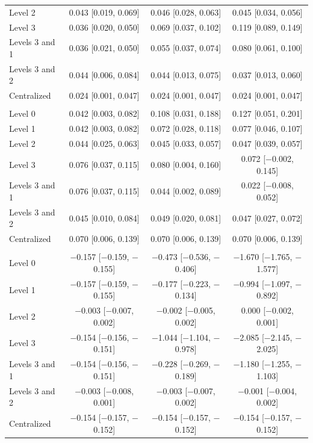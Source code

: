 \begin{tabular}{lccc}
Level 2 & 0.043 [0.019, 0.069] & 0.046 [0.028, 0.063] & 0.045 [0.034, 0.056] \\
Level 3 & 0.036 [0.020, 0.050] & 0.069 [0.037, 0.102] & 0.119 [0.089, 0.149] \\
Levels 3 and 1 & 0.036 [0.021, 0.050] & 0.055 [0.037, 0.074] & 0.080 [0.061, 0.100] \\
Levels 3 and 2 & 0.044 [0.006, 0.084] & 0.044 [0.013, 0.075] & 0.037 [0.013, 0.060] \\
Centralized & 0.024 [0.001, 0.047] & 0.024 [0.001, 0.047] & 0.024 [0.001, 0.047] \\
\addlinespace
\multicolumn{4}{@{}l}{\textit{Diabetic, XGBoost}} \\
Level 0 & 0.042 [0.003, 0.082] & 0.108 [0.031, 0.188] & 0.127 [0.051, 0.201] \\
Level 1 & 0.042 [0.003, 0.082] & 0.072 [0.028, 0.118] & 0.077 [0.046, 0.107] \\
Level 2 & 0.044 [0.025, 0.063] & 0.045 [0.033, 0.057] & 0.047 [0.039, 0.057] \\
Level 3 & 0.076 [0.037, 0.115] & 0.080 [0.004, 0.160] & 0.072 [$-$0.002, 0.145] \\
Levels 3 and 1 & 0.076 [0.037, 0.115] & 0.044 [0.002, 0.089] & 0.022 [$-$0.008, 0.052] \\
Levels 3 and 2 & 0.045 [0.010, 0.084] & 0.049 [0.020, 0.081] & 0.047 [0.027, 0.072] \\
Centralized & 0.070 [0.006, 0.139] & 0.070 [0.006, 0.139] & 0.070 [0.006, 0.139] \\
\addlinespace
\multicolumn{4}{@{}l}{\textit{Heart, Random Forest}} \\
Level 0 & $-$0.157 [$-$0.159, $-$0.155] & $-$0.473 [$-$0.536, $-$0.406] & $-$1.670 [$-$1.765, $-$1.577] \\
Level 1 & $-$0.157 [$-$0.159, $-$0.155] & $-$0.177 [$-$0.223, $-$0.134] & $-$0.994 [$-$1.097, $-$0.892] \\
Level 2 & $-$0.003 [$-$0.007, 0.002] & $-$0.002 [$-$0.005, 0.002] & 0.000 [$-$0.002, 0.001] \\
Level 3 & $-$0.154 [$-$0.156, $-$0.151] & $-$1.044 [$-$1.104, $-$0.978] & $-$2.085 [$-$2.145, $-$2.025] \\
Levels 3 and 1 & $-$0.154 [$-$0.156, $-$0.151] & $-$0.228 [$-$0.269, $-$0.189] & $-$1.180 [$-$1.255, $-$1.103] \\
Levels 3 and 2 & $-$0.003 [$-$0.008, 0.001] & $-$0.003 [$-$0.007, 0.002] & $-$0.001 [$-$0.004, 0.002] \\
Centralized & $-$0.154 [$-$0.157, $-$0.152] & $-$0.154 [$-$0.157, $-$0.152] & $-$0.154 [$-$0.157, $-$0.152] \\

\end{tabular}
